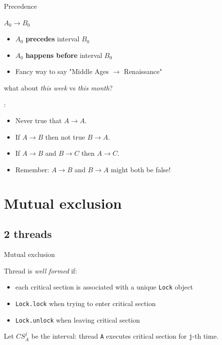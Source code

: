 \begin{frame}[fragile]{Precedence}

$A_0 \rightarrow B_0$
\begin{itemize}
  \item $A_0$ \textbf{precedes} interval $B_0$
  \pause
  \item $A_0$ \textbf{happens before} interval $B_0$
  \pause
  \item Fancy way to say "Middle Ages $\rightarrow$ Renaissance"
\end{itemize}

\pause

what about \textit{this week} vs \textit{this month}?

\pause

:
\begin{itemize}
  \item Never true that $A \rightarrow A$. 
  \item If $A \rightarrow B$ then not true $B \rightarrow A$.  
  \item If $A \rightarrow B$ and $B \rightarrow C$ then $A \rightarrow C$. 
  \pause
  \item Remember: $A \rightarrow B$ and $B \rightarrow A$ might both be false!
\end{itemize}

\end{frame}



\section{Mutual exclusion}
\showTOC

\subsection{2 threads}

\begin{frame}{Mutual exclusion}

Thread is \textit{well formed} if:
\begin{itemize}
  \item each critical section is associated with a unique \texttt{Lock} object
  \item \texttt{Lock.lock} when trying to enter critical section
  \item \texttt{Lock.unlock} when leaving critical section
\end{itemize}

Let $CS_{A}^{j}$ be the interval: thread \texttt{A} executes critical section for \texttt{j}-th time.

\end{frame}

